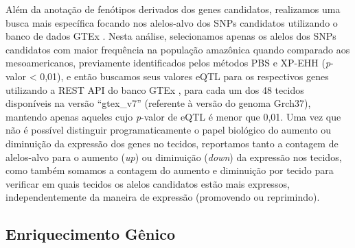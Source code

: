 Além da anotação de fenótipos derivados dos genes candidatos, realizamos uma busca mais específica focando nos alelos-alvo dos SNPs candidatos utilizando o banco de dados GTEx \cite{gtex_consortium_genotype-tissue_2013}. Nesta análise, selecionamos apenas os alelos dos SNPs candidatos com maior frequência na população amazônica quando comparado aos mesoamericanos, previamente identificados pelos métodos PBS e XP-EHH (\emph{p}-valor < 0,01), e então buscamos seus valores eQTL para os respectivos genes utilizando a REST API do banco GTEx \cite{gtex_consortium_genotype-tissue_2013}, para cada um dos 48 tecidos disponíveis na versão “gtex\_v7” (referente à versão do genoma Grch37), mantendo apenas aqueles cujo \emph{p}-valor de eQTL é menor que 0,01. Uma vez que não é possível distinguir programaticamente o papel biológico do aumento ou diminuição da expressão dos genes no tecidos, reportamos tanto a contagem de alelos-alvo para o aumento (\textit{up}) ou diminuição (\textit{down}) da expressão nos tecidos, como também somamos a contagem do aumento e diminuição por tecido para verificar em quais tecidos os alelos candidatos estão mais expressos, independentemente da maneira de expressão (promovendo ou reprimindo). 

\subsection{Enriquecimento Gênico}

